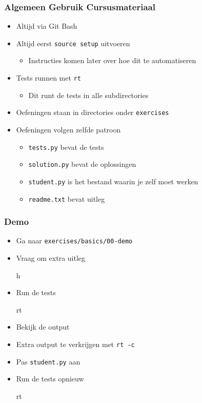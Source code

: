 \begin{frame}
  \frametitle{Algemeen Gebruik Cursusmateriaal}
  \begin{itemize}
    \item Altijd via Git Bash
    \item Altijd eerst \texttt{source setup} uitvoeren
          \begin{itemize}
            \item Instructies komen later over hoe dit te automatiseren
          \end{itemize}
    \item Tests runnen met \texttt{rt}
          \begin{itemize}
            \item Dit runt de tests in alle subdirectories
          \end{itemize}
    \item Oefeningen staan in directories onder \texttt{exercises}
    \item Oefeningen volgen zelfde patroon
          \begin{itemize}
            \item \texttt{tests.py} bevat de tests
            \item \texttt{solution.py} bevat de oplossingen
            \item \texttt{student.py} is het bestand waarin je zelf moet werken
            \item \texttt{readme.txt} bevat uitleg
          \end{itemize}
  \end{itemize}
\end{frame}

\begin{frame}
  \frametitle{Demo}
  \begin{itemize}
    \item Ga naar \texttt{exercises/basics/00-demo}
    \item Vraag om extra uitleg
          \begin{center} \ttfamily
            h
          \end{center}
    \item Run de tests
          \begin{center} \ttfamily
            rt
          \end{center}
    \item Bekijk de output
    \item Extra output te verkrijgen met \texttt{rt -c}
    \item Pas \texttt{student.py} aan
    \item Run de tests opnieuw
          \begin{center} \ttfamily
            rt
          \end{center}
  \end{itemize}
\end{frame}

